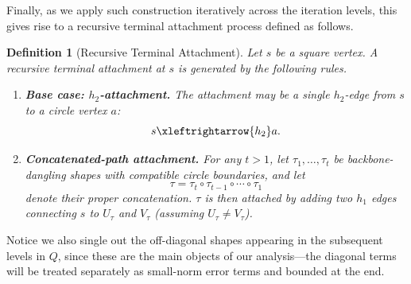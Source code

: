 \documentclass[12pt]{article}
\newtheorem{definition}[theorem]{Definition}
\newcommand{\calR}{\mathcal{R}}
\newcommand{\Authornote}[3]{{\sf\footnotesize\color{#3}{[#1: #2]}}}
\newcommand{\Authornote}[3]{}
\newcommand{\anote}[1]{\Authornote{Aaron}{#1}{cyan}}
\begin{document}
Finally, as we apply such construction iteratively across the iteration levels, this gives rise to a recursive terminal attachment process defined as follows.
\begin{definition}[Recursive Terminal Attachment]
Let \(s\) be a square vertex. A recursive terminal attachment at \(s\) is
generated by the following rules.

\begin{enumerate}
    \item \textbf{Base case: \(h_2\)-attachment.}
    The attachment may be a single \(h_2\)-edge from \(s\) to a circle vertex
    \(a\):
    \[
        s \xleftrightarrow{h_2} a .
    \]

    \item \textbf{Concatenated-path attachment.}
    For any \(t > 1\), let \(\tau_1,\ldots,\tau_t\) be backbone-dangling
    shapes with compatible circle boundaries, and let    \[
        \tau =\tau_t \circ \tau_{t-1}\circ \cdots \circ \tau_1
    \]
    denote their proper concatenation. $\tau$ is then attached by adding two $h_1$ edges connecting $s$ to $U_\tau$ and $V_\tau$ (assuming $U_\tau\neq V_\tau$).
%    
\end{enumerate}
\end{definition}

Notice we also single out the off-diagonal shapes appearing in the subsequent levels in \(Q\), since these are
the main objects of our analysis---the diagonal terms will be treated separately
as small-norm error terms and bounded at the end.
\end{document}
